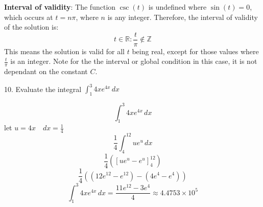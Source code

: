 \documentclass[a4paper, 12pt]{report}
\def\ni{green!60!black!40!white}
\begin{document}
    \textbf{Interval of validity}: The function \( \csc(t) \) is undefined where \( \sin(t) = 0 \), which occurs at \( t = n\pi \), where \( n \) is any integer. Therefore, the interval of validity of the solution is:
    \[ t \in \mathbb{R} : \frac{t}{\pi} \notin \mathbb{Z} \]
    This means the solution is valid for all \( t \) being real, except for those values where \( \frac{t}{\pi} \) is an integer. Note for the the interval or global condition in this case, it is not dependant on the constant \(C\).
    
    
    \newpage
    
    \begin{tcolorbox}[title={\color{black}\section{Q10}}, colback=white, colframe=\ni, boxrule=1mm, width=1\textwidth]
        10. Evaluate the integral \( \int_{1}^{3} 4x e^{4x} \, dx \)
    \end{tcolorbox}
       
    \[\int_{1}^{3} 4x e^{4x} \, dx\]
    let \(u=4x \quad dx=\frac{1}{4}\)
    \[\frac{1}{4}\int_{4}^{12} u e^{u} \, dx\]
    \[\frac{1}{4} \left([u e^{u}-e^{u}]_{4}^{12}\right)\]
    \[\frac{1}{4} \left(\left(12 e^{12}-e^{12}\right)-\left(4 e^{4}-e^{4}\right)\right)\]
    \[\boxed{\int_{1}^{3} 4x e^{4x} \, dx=\frac{11e^{12}-3e^{4}}{4} \approx 4.4753\times10^5}\]
\end{document}
